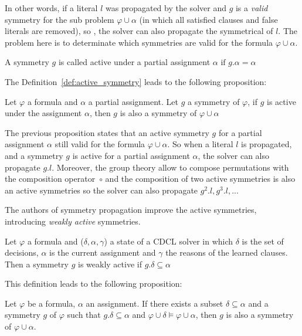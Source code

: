 In other words, if a literal $l$ was propagated by the solver and $g$ is a \emph{valid} symmetry for the
sub problem $\varphi \cup \alpha$ (in which all satisfied clauses and false literals are removed), so , the solver can
also propagate the symmetrical of $l$. The problem here is to determinate which symmetries are valid for the formula
$\varphi \cup \alpha$.

\begin{definition}
	\label{def:active_symmetry}
	A symmetry $g$ is called active under a partial assignment $\alpha$ $\text{if } g.\alpha = \alpha$
\end{definition}

The Definition~\ref{def:active_symmetry} leads to the following proposition:

\begin{proposition}
	\label{prop:active_symmetry}
	Let $\varphi$ a formula and $\alpha$ a partial assignment. Let $g$ a symmetry of $\varphi$,
	if $g$ is active under the assignment $\alpha$, then $g$ is also a symmetry of $\varphi \cup \alpha$
\end{proposition}

The previous proposition states that an active symmetry $g$ for a partial assignment $\alpha$ still valid for
the formula $\varphi \cup \alpha$. So when a literal $l$ is propagated, and a symmetry $g$ is active for a
partial assignment $\alpha$, the solver can also propagate $g.l$. 
Moreover, the group theory allow to compose permutations with the composition operator~$\circ$ and the composition of two active symmetries is also an active symmetries so the solver can also propagate $g^2.l, g^3.l, ... $


The authors of symmetry propagation improve the active symmetries, introducing \emph{weakly active} symmetries.

\begin{definition}
	\label{def:weakly_active_symmetry}
	Let $\varphi$ a formula and ($\delta, \alpha, \gamma$) a state of a CDCL solver in which $\delta$ is the set of decisions,
	$\alpha$ is the current assignment and $\gamma$ the reasons of the learned clauses. Then a symmetry $g$ is weakly active 
	if $g.\delta \subseteq \alpha$
\end{definition}

This definition leads to the following proposition:

\begin{proposition}
	Let $\varphi$ be a formula, $\alpha $ an assignment. If
	there exists a subset $\delta \subseteq \alpha $ and a symmetry $g$ of $\varphi$ such that 
	$g.\delta \subseteq \alpha $ and $\varphi \cup \delta \models \varphi \cup \alpha$, then $g$ 
	is also a symmetry of $\varphi \cup \alpha $.
\end{proposition}

